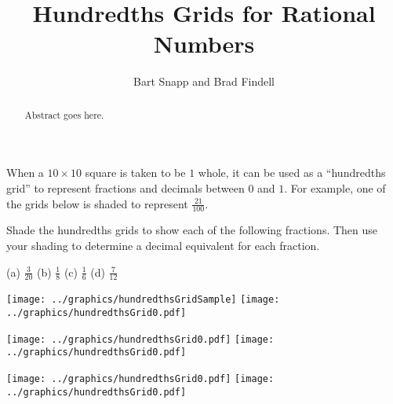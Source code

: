 \documentclass{ximera}
\title{Hundredths Grids for Rational Numbers}
\author{Bart Snapp and Brad Findell}
\begin{document}
\begin{abstract}
Abstract goes here.  
\end{abstract}
\maketitle

\label{A:hundredthsGrids}


When a $10\times 10$ square is taken to be $1$ whole, it can be used as a ``hundredths grid'' 
to represent fractions and decimals between $0$ and $1$. For example, one of the grids below 
is shaded to represent $\frac{21}{100}$.

\begin{problem}
Shade the hundredths grids to show each of the following fractions.  Then use your shading to determine a decimal equivalent for each fraction.  
\begin{center}
\hfill (a) $\frac{3}{20}$ \hfill (b) $\frac{1}{8}$ \hfill (c) $\frac{1}{6}$ \hfill (d) $\frac{7}{12}$ \hfill
\end{center}

\begin{image}
\texttt{[image: ../graphics/hundredthsGridSample]}\quad
\texttt{[image: ../graphics/hundredthsGrid0.pdf]}
\end{image}
\begin{image}
\texttt{[image: ../graphics/hundredthsGrid0.pdf]}\quad
\texttt{[image: ../graphics/hundredthsGrid0.pdf]}
\end{image}
\begin{image}
\texttt{[image: ../graphics/hundredthsGrid0.pdf]}\quad
\texttt{[image: ../graphics/hundredthsGrid0.pdf]}
\end{image}

\end{problem}
\end{document}
